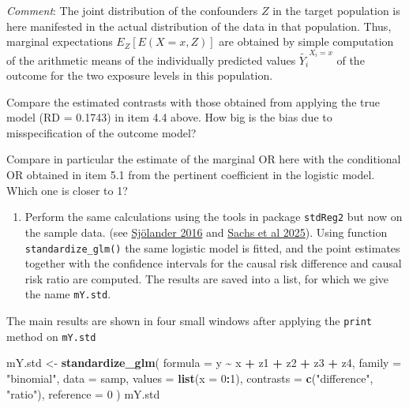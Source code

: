 \documentclass[
]{book}
\newenvironment{Shaded}{\begin{snugshade}}{\end{snugshade}}
\newcommand{\AttributeTok}[1]{\textcolor[rgb]{0.13,0.29,0.53}{#1}}
\newcommand{\DecValTok}[1]{\textcolor[rgb]{0.00,0.00,0.81}{#1}}
\newcommand{\FunctionTok}[1]{\textcolor[rgb]{0.13,0.29,0.53}{\textbf{#1}}}
\newcommand{\NormalTok}[1]{#1}
\newcommand{\OtherTok}[1]{\textcolor[rgb]{0.56,0.35,0.01}{#1}}
\newcommand{\SpecialCharTok}[1]{\textcolor[rgb]{0.81,0.36,0.00}{\textbf{#1}}}
\newcommand{\StringTok}[1]{\textcolor[rgb]{0.31,0.60,0.02}{#1}}
\providecommand{\tightlist}{%
  \setlength{\itemsep}{0pt}\setlength{\parskip}{0pt}}
\begin{document}
\emph{Comment}: The joint distribution of the confounders \(Z\) in the target
population is here manifested in the actual distribution of the data in
that population. Thus, marginal expectations \(E_Z[E(X=x, Z)]\) are
obtained by simple computation of the arithmetic means of the
individually predicted values \(\widetilde{Y_i}^{X_i=x}\) of the outcome
for the two exposure levels in this population.

Compare the estimated contrasts with those obtained from applying the
true model (RD = 0.1743) in item 4.4 above. How big is the bias due to
misspecification of the outcome model?

Compare in particular the estimate of the marginal OR here with the
conditional OR obtained in item 5.1 from the pertinent coefficient in
the logistic model. Which one is closer to 1?

\begin{enumerate}
\def\labelenumi{\arabic{enumi}.}
\setcounter{enumi}{3}
\tightlist
\item
  Perform the same calculations using the tools in package \texttt{stdReg2}
  but now on the sample data. (see \href{https://doi.org/10.1007/s10654-016-0157-3}{Sjölander
  2016} and \href{https://doi.org/10.1016/j.annepidem.2025.04.002}{Sachs et al
  2025}). Using
  function \texttt{standardize\_glm()} the same logistic model is fitted, and
  the point estimates together with the confidence intervals for the
  causal risk difference and causal risk ratio are computed. The
  results are saved into a list, for which we give the name \texttt{mY.std}.
\end{enumerate}

The main results are shown in four small windows
after applying the \texttt{print} method on \texttt{mY.std}

\begin{Shaded}
\begin{Highlighting}[]
\NormalTok{mY.std }\OtherTok{\textless{}{-}} \FunctionTok{standardize\_glm}\NormalTok{(}
 \AttributeTok{formula =}\NormalTok{ y }\SpecialCharTok{\textasciitilde{}}\NormalTok{ x }\SpecialCharTok{+}\NormalTok{ z1 }\SpecialCharTok{+}\NormalTok{ z2 }\SpecialCharTok{+}\NormalTok{ z3 }\SpecialCharTok{+}\NormalTok{ z4,}
 \AttributeTok{family =} \StringTok{"binomial"}\NormalTok{,}
 \AttributeTok{data =}\NormalTok{ samp,}
 \AttributeTok{values =} \FunctionTok{list}\NormalTok{(}\AttributeTok{x =} \DecValTok{0}\SpecialCharTok{:}\DecValTok{1}\NormalTok{),}
 \AttributeTok{contrasts =} \FunctionTok{c}\NormalTok{(}\StringTok{"difference"}\NormalTok{, }\StringTok{"ratio"}\NormalTok{),}
 \AttributeTok{reference =} \DecValTok{0}
\NormalTok{)}
\NormalTok{mY.std}
\end{Highlighting}
\end{Shaded}
\end{document}
